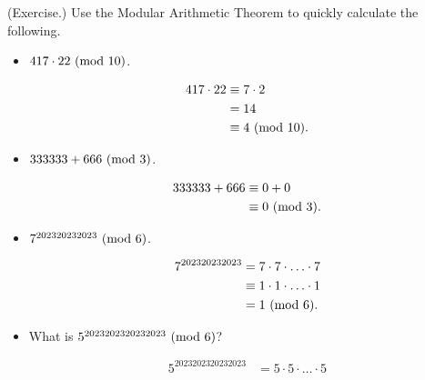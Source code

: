 \documentclass[letterpaper]{article}
\newcommand{\0}{\mathbf{0}}
\begin{document}
\begin{mdframed}
    (Exercise.) Use the Modular Arithmetic Theorem to quickly calculate the following. 
    \begin{itemize}
        \item $417 \cdot 22 \ (\mathrm{mod}\ 10)$.
        \begin{mdframed}
            \begin{equation*}
                \begin{aligned}
                    417 \cdot 22 &\equiv 7 \cdot 2  \\ 
                        &= 14 \\ 
                        &\equiv 4 \ (\mathrm{mod}\ 10).
                \end{aligned}
            \end{equation*}
        \end{mdframed}
        \item $333333 + 666 \ (\mathrm{mod}\ 3)$.
        \begin{mdframed}
            \begin{equation*}
                \begin{aligned}
                    333333 + 666 &\equiv 0 + 0 \\ 
                        &\equiv 0 \ (\mathrm{mod}\ 3).
                \end{aligned}
            \end{equation*}
        \end{mdframed}
        \item $7^{202320232023} \ (\mathrm{mod}\ 6)$. 
        \begin{mdframed}
            \begin{equation*}
                \begin{aligned}
                    7^{202320232023} &= 7 \cdot 7 \cdot \hdots \cdot 7 \\ 
                        &\equiv 1 \cdot 1 \cdot \hdots \cdot 1 \\ 
                        &= 1 \ (\mathrm{mod}\ 6).
                \end{aligned}
            \end{equation*}
        \end{mdframed}
        \item What is $5^{2023202320232023} \ (\mathrm{mod}\ 6)$?
        \begin{mdframed}
            \begin{equation*}
                \begin{aligned}
                    5^{2023202320232023} &= 5 \cdot 5 \cdot \hdots \cdot 5 \\ 

\end{aligned}
\end{equation*}
\end{mdframed}
\end{itemize}
\end{mdframed}
\end{document}

